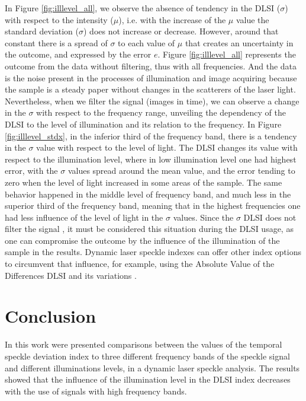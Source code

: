 \documentclass[review]{elsarticle}
\begin{document}
In Figure \ref{fig:illlevel_all}, we observe the absence of tendency in the DLSI ($\sigma$) with respect to the intensity ($\mu$), i.e. with the increase of the $\mu$ value the standard deviation ($\sigma$) does not increase or decrease. However, around that constant there is a spread of $\sigma$ to each value of $\mu$ that creates an uncertainty in the outcome, and expressed by the error $e$. Figure \ref{fig:illlevel_all} represents the outcome from the data without filtering, thus with all frequencies. And the data is the noise present in the processes of illumination and image acquiring because the sample is a steady paper without changes in the scatterers of the laser light.
Nevertheless, when we filter the signal (images in time), we can observe a change in the $\sigma$ with respect to the frequency range, unveiling the dependency of the DLSI to the level of illumination and its relation to the frequency.
In Figure \ref{fig:illlevel_stdx}, in the inferior third of the frequency band, there is a tendency in the $\sigma$ value with respect to the level of light. The DLSI changes its value with respect to the illumination level, where in low illumination level one had highest error, with the $\sigma$ values spread around the mean value, and the error tending to zero when the level of light increased in some areas of the sample. The same behavior happened in the middle level of frequency band, and much less in the superior third of the frequency band, meaning that in the highest frequencies one had less influence of the level of light in the $\sigma$ values. Since the $\sigma$ DLSI does not filter the signal \cite{RIVERA2017144}, it must be considered this situation during the DLSI usage, as one can compromise the outcome by the influence of the illumination of the sample in the results. Dynamic laser speckle indexes can offer other index  options to circumvent that influence, for example, using the Absolute Value of the Differences DLSI and its variations \cite{BSLTLBOOK}.



\section{Conclusion} 

In this work were presented comparisons between the values of the temporal speckle 
deviation index to three different frequency bands of the speckle signal and
different illuminations levels, in a
dynamic laser speckle analysis. The results showed that the influence of the illumination level in
the DLSI index decreases with the use of signals with high frequency bands.
\end{document}
